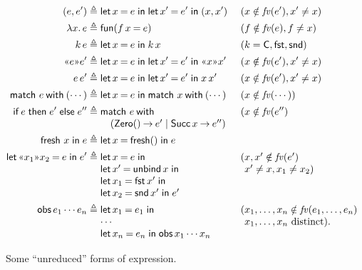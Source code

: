 \documentclass{LMCS}
\theoremstyle{plain}
\theoremstyle{definition}
\newcommand{\ALT}{\mathrel{\kw{|}}}
\newcommand{\BINDVAL}[2]{\mathopen{\text{\normalfont\guillemotleft}}#1
  \mathclose{\text{\normalfont\guillemotright}}#2}
\newcommand{\CON}[1][C]{\kw{#1}}
\newcommand{\defeq}{\triangleq}
\newcommand{\ELSE}{\mathrel{\kw{else}}}
\newcommand{\EQ}{\mathbin{\kw{=}}}
\renewcommand{\exp}[1][e]{#1}
\newcommand{\FRESH}{\kw{fresh}}
\newcommand{\FST}{\kw{fst}}
\newcommand{\FUN}{\kw{fun}}
\newcommand{\fv}{\mathit{fv}}
\newcommand{\IF}{\mathop{\kw{if}}}
\newcommand{\IN}{\mathrel{\kw{in}}}
\newcommand{\LET}{\mathop{\kw{let}}}
\newcommand{\kw}[1]{\mathsf{#1}}
\newcommand{\MATCH}{\kw{match}}
\newcommand{\OBS}[1][obs]{\kw{#1}}
\newcommand{\THEN}{\mathrel{\kw{then}}}
\newcommand{\TO}{\mathbin{\rightarrow}}
\newcommand{\UNBIND}{\kw{unbind}}
\newcommand{\vid}[1][x]{#1}
\newcommand{\WITH}{\mathbin{\kw{with}}}
\begin{document}
\begin{figure}\small
  \centering
  \begin{align*}
    (\exp,\exp') &\defeq \LET\vid\EQ\exp\IN\LET\vid'\EQ\exp'\IN
    (\vid,\vid')
    &&(\vid\notin\fv(\exp'), \vid'\not=\vid)\\
    \lambda \vid.\,\exp &\defeq \FUN(\vid[f]\,\vid \EQ \exp)
    &&(\vid[f]\notin\fv(\exp),\vid[f]\not=\vid)\\
     k\,\exp &\defeq \LET\vid\EQ\exp\IN k\,\vid
    &&(k=\CON,\FST,\SND)\\
     \BINDVAL{\exp}{\exp'} &\defeq \LET\vid\EQ\exp\IN\LET\vid'\EQ\exp'\IN
    \BINDVAL{\vid}{\vid'}
    &&(\vid\notin\fv(\exp'), \vid'\not=\vid)\\
    \exp\,\exp' &\defeq \LET\vid\EQ\exp\IN\LET\vid'\EQ\exp'\IN
    \vid\,\vid'
    &&(\vid\notin\fv(\exp'), \vid'\not=\vid)\\
    \MATCH\ \exp \WITH (\cdots) &\defeq \LET\vid\EQ\exp\IN\MATCH\
    \vid\WITH(\cdots)
    &&(\vid\notin\fv(\cdots))\\
    \IF \exp \THEN\exp' \ELSE \exp''
    &\defeq 
    \begin{array}[t]{@{}l}
      \MATCH\ \exp \WITH {}\\
      \quad (\CON[Zero]()\TO\exp' \ALT \CON[Succ]\,\vid\TO\exp'')
    \end{array}
    &&(\vid\notin\fv(\exp'')\\
    \FRESH\ \vid\IN \exp &\defeq \LET\vid\EQ\FRESH()\IN\exp\\
    \LET {\BINDVAL{\vid_1}{\vid_2}\EQ\exp} \IN \exp' &\defeq
    \begin{array}[t]{@{}l}
      \LET\vid\EQ\exp\IN\\
      \LET\vid'\EQ\UNBIND\,\vid\IN\\
      \LET\vid_1\EQ\FST\,\vid'\IN\\
      \LET\vid_2\EQ\SND\,\vid'\IN \exp'
    \end{array}
    &&
    (\begin{array}[t]{@{}l}
      \vid,\vid'\notin\fv(\exp')\\
      \vid'\not=\vid, \vid_1\not=\vid_2)
    \end{array}\\
     \OBS\,\exp_1\cdots\exp_n &\defeq
    \begin{array}[t]{@{}l}
      \LET\vid_1\EQ\exp_1\IN\\
      \cdots\\
      \LET\vid_n\EQ\exp_n\IN\OBS\,\vid_1\cdots\vid_n
    \end{array}
    &&
    (\begin{array}[t]{@{}l}
      \vid_1,\ldots,\vid_n\notin\fv(\exp_1,\ldots,\exp_n)\\
      \vid_1,\ldots,\vid_n\ \text{distinct}).
    \end{array}
  \end{align*}
  \caption{Some ``unreduced'' forms of expression.}
  \label{fig:unrfe}
\end{figure}
\end{document}
